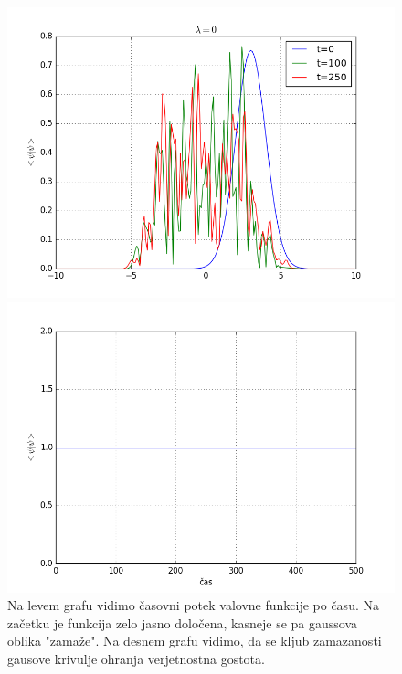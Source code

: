 \documentclass[slovene,11pt,a4paper]{article}
\numberwithin{equation}{section} %
\numberwithin{figure}{section} %
\numberwithin{table}{section} %
\begin{document}
\begin{figure}[!htb]
\centering
\begin{minipage}{0.5\textwidth}
\centering
\includegraphics[scale=0.45]{slike/casovni_razvoj_izmika.png}
\end{minipage}\hfill
\begin{minipage}{0.5\textwidth}
\centering
\includegraphics[scale=0.45]{slike/ohranjanje_delcev.png}
\end{minipage}

\caption{Na levem grafu vidimo časovni potek valovne funkcije po času. Na začetku je funkcija zelo jasno določena, kasneje se pa gaussova oblika "zamaže". Na desnem grafu vidimo, da se kljub zamazanosti gausove krivulje ohranja verjetnostna gostota.}
\end{figure}
\end{document}
